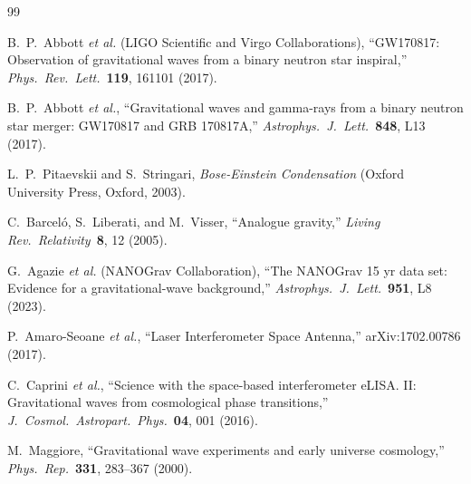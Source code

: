 \documentclass[11pt,a4paper]{article}
\theoremstyle{definition}
\theoremstyle{remark}
\begin{document}
\begin{thebibliography}{99}

B.~P.~Abbott \emph{et al.} (LIGO Scientific and Virgo Collaborations), ``GW170817: Observation of gravitational waves from a binary neutron star inspiral,'' \emph{Phys.\ Rev.\ Lett.}\ \textbf{119}, 161101 (2017).

B.~P.~Abbott \emph{et al.}, ``Gravitational waves and gamma-rays from a binary neutron star merger: GW170817 and GRB 170817A,'' \emph{Astrophys.\ J.\ Lett.}\ \textbf{848}, L13 (2017).

L.~P.~Pitaevskii and S.~Stringari, \emph{Bose-Einstein Condensation} (Oxford University Press, Oxford, 2003).

C.~Barcel\'{o}, S.~Liberati, and M.~Visser, ``Analogue gravity,'' \emph{Living Rev.\ Relativity}\ \textbf{8}, 12 (2005).

G.~Agazie \emph{et al.} (NANOGrav Collaboration), ``The NANOGrav 15 yr data set: Evidence for a gravitational-wave background,'' \emph{Astrophys.\ J.\ Lett.}\ \textbf{951}, L8 (2023).

P.~Amaro-Seoane \emph{et al.}, ``Laser Interferometer Space Antenna,'' arXiv:1702.00786 (2017).

C.~Caprini \emph{et al.}, ``Science with the space-based interferometer eLISA. II: Gravitational waves from cosmological phase transitions,'' \emph{J.\ Cosmol.\ Astropart.\ Phys.}\ \textbf{04}, 001 (2016).

M.~Maggiore, ``Gravitational wave experiments and early universe cosmology,'' \emph{Phys.\ Rep.}\ \textbf{331}, 283--367 (2000).

\end{thebibliography}
\end{document}

